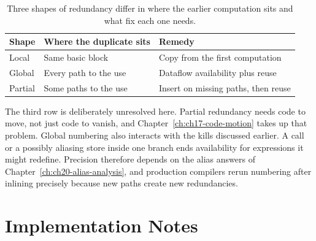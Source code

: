 \begin{table}
  \centering
  \caption{Three shapes of redundancy differ in where the earlier computation sits and what fix each one needs.}
  \label{tab:ch16-kinds}
  \begin{tabular}{lll}
    \toprule
    Shape & Where the duplicate sits & Remedy \\
    \midrule
    Local & Same basic block & Copy from the first computation \\
    Global & Every path to the use & Dataflow availability plus reuse \\
    Partial & Some paths to the use & Insert on missing paths, then reuse \\
    \bottomrule
  \end{tabular}
\end{table}

The third row is deliberately unresolved here.
Partial redundancy needs code to move, not just code to vanish, and Chapter~\ref{ch:ch17-code-motion} takes up that problem.
Global numbering also interacts with the kills discussed earlier.
A call or a possibly aliasing store inside one branch ends availability for expressions it might redefine.
Precision therefore depends on the alias answers of Chapter~\ref{ch:ch20-alias-analysis}, and production compilers rerun numbering after inlining precisely because new paths create new redundancies.

\section{Implementation Notes}
\label{sec:ch16-implementation}

